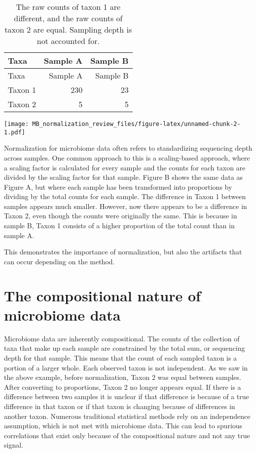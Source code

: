 \documentclass[
]{book}
\begin{document}
\begin{longtable}[]{@{}lrr@{}}
\caption{\label{tab:unnamed-chunk-1}The raw counts of taxon 1 are different, and the raw counts of taxon 2 are equal. Sampling depth is not accounted for.}\tabularnewline
\toprule
Taxa & Sample A & Sample B\tabularnewline
\midrule
\endfirsthead
\toprule
Taxa & Sample A & Sample B\tabularnewline
\midrule
\endhead
Taxon 1 & 230 & 23\tabularnewline
Taxon 2 & 5 & 5\tabularnewline
\bottomrule
\end{longtable}

\texttt{[image: MB\_normalization\_review\_files/figure-latex/unnamed-chunk-2-1.pdf]}

Normalization for microbiome data often refers to standardizing sequencing depth across samples. One common approach to this is a scaling-based approach, where a scaling factor is calculated for every sample and the counts for each taxon are divided by the scaling factor for that sample. Figure B shows the same data as Figure A, but where each sample has been transformed into proportions by dividing by the total counts for each sample. The difference in Taxon 1 between samples appears much smaller. However, now there appears to be a difference in Taxon 2, even though the counts were originally the same. This is because in sample B, Taxon 1 consists of a higher proportion of the total count than in sample A.

This demonstrates the importance of normalization, but also the artifacts that can occur depending on the method.

\hypertarget{the-compositional-nature-of-microbiome-data}{%
\section{The compositional nature of microbiome data}\label{the-compositional-nature-of-microbiome-data}}

Microbiome data are inherently compositional. The counts of the collection of taxa that make up each sample are constrained by the total sum, or sequencing depth for that sample. This means that the count of each sampled taxon is a portion of a larger whole. Each observed taxon is not independent. As we saw in the above example, before normalization, Taxon 2 was equal between samples. After converting to proportions, Taxon 2 no longer appears equal. If there is a difference between two samples it is unclear if that difference is because of a true difference in that taxon or if that taxon is changing because of differences in another taxon. Numerous traditional statistical methods rely on an independence assumption, which is not met with microbiome data. This can lead to spurious correlations that exist only because of the compositional nature and not any true signal.
\end{document}
